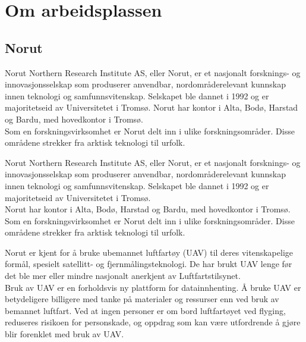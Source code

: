 \documentclass[12pt, a4paper]{article}
\begin{document}


\newpage
\section{Om arbeidsplassen}
\subsection{Norut}

Norut Northern Research Institute AS, eller Norut, er et nasjonalt forsknings- og innovasjonsselskap som produserer anvendbar, nordområderelevant kunnskap innen teknologi og samfunnsvitenskap. Selskapet ble dannet i 1992 og er majoritetseid av Universitetet i Tromsø. Norut har kontor i Alta, Bodø, Harstad og Bardu, med hovedkontor i Tromsø. \\

Som en forskningsvirksomhet er Norut delt inn i ulike forskningsområder. Disse områdene strekker fra arktisk teknologi til urfolk.

Norut Northern Research Institute AS, eller Norut, er et nasjonalt forsknings- og innovasjonsselskap som produserer anvendbar, nordområderelevant kunnskap innen teknologi og samfunnsvitenskap. Selskapet ble dannet i 1992 og er majoritetseid av Universitetet i Tromsø. \\

Norut har kontor i Alta, Bodø, Harstad og Bardu, med hovedkontor i Tromsø. \\

Som en forskningsvirksomhet er Norut delt inn i ulike forskningsområder. Disse områdene strekker fra arktisk teknologi til urfolk.


Norut er kjent for å bruke ubemannet luftfartøy (UAV) til deres vitenskapelige formål, spesielt satellitt- og fjernmålingsteknologi.  De har brukt UAV lenge før det ble mer eller mindre nasjonalt anerkjent av Luftfartstilsynet.\\

Bruk av UAV er en forholdsvis ny plattform for datainnhenting. Å bruke UAV er betydeligere billigere med tanke på materialer og ressurser enn ved bruk av bemannet luftfart. Ved at ingen personer er om bord luftfartøyet ved flyging, reduseres risikoen for personskade, og oppdrag som kan være utfordrende å gjøre blir forenklet med bruk av UAV. \\
\end{document}

